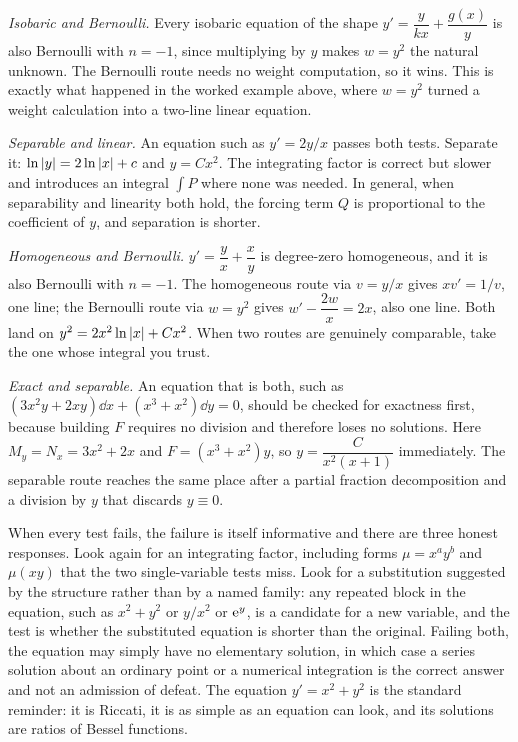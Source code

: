 \emph{Isobaric and Bernoulli.} Every isobaric equation of the shape $y'=\dfrac{y}{kx}+\dfrac{g(x)}{y}$ is also Bernoulli with $n=-1$, since multiplying by $y$ makes $w=y^{2}$ the natural unknown. The Bernoulli route needs no weight computation, so it wins. This is exactly what happened in the worked example above, where $w=y^{2}$ turned a weight calculation into a two-line linear equation.

\emph{Separable and linear.} An equation such as $y'=2y/x$ passes both tests. Separate it: $\ln\left\lvert y\right\rvert=2\ln\left\lvert x\right\rvert+c$ and $y=Cx^{2}$. The integrating factor is correct but slower and introduces an integral $\int P$ where none was needed. In general, when separability and linearity both hold, the forcing term $Q$ is proportional to the coefficient of $y$, and separation is shorter.

\emph{Homogeneous and Bernoulli.} $y'=\dfrac yx+\dfrac xy$ is degree-zero homogeneous, and it is also Bernoulli with $n=-1$. The homogeneous route via $v=y/x$ gives $xv'=1/v$, one line; the Bernoulli route via $w=y^{2}$ gives $w'-\dfrac{2w}{x}=2x$, also one line. Both land on $y^{2}=2x^{2}\ln\left\lvert x\right\rvert+Cx^{2}$. When two routes are genuinely comparable, take the one whose integral you trust.

\emph{Exact and separable.} An equation that is both, such as $(3x^{2}y+2xy)\dd x+(x^{3}+x^{2})\dd y=0$, should be checked for exactness first, because building $F$ requires no division and therefore loses no solutions. Here $M_y=N_x=3x^{2}+2x$ and $F=(x^{3}+x^{2})y$, so $y=\dfrac{C}{x^{2}(x+1)}$ immediately. The separable route reaches the same place after a partial fraction decomposition and a division by $y$ that discards $y\equiv0$.

When every test fails, the failure is itself informative and there are three honest responses. Look again for an integrating factor, including forms $\mu=x^{a}y^{b}$ and $\mu(xy)$ that the two single-variable tests miss. Look for a substitution suggested by the structure rather than by a named family: any repeated block in the equation, such as $x^{2}+y^{2}$ or $y/x^{2}$ or $\mathrm{e}^{y}$, is a candidate for a new variable, and the test is whether the substituted equation is shorter than the original. Failing both, the equation may simply have no elementary solution, in which case a series solution about an ordinary point or a numerical integration is the correct answer and not an admission of defeat. The equation $y'=x^{2}+y^{2}$ is the standard reminder: it is Riccati, it is as simple as an equation can look, and its solutions are ratios of Bessel functions.

